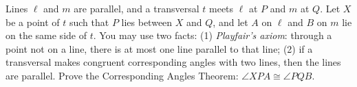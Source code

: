 Lines $\ell$ and $m$ are parallel, and a transversal $t$ meets $\ell$ at $P$ and $m$ at $Q$. Let $X$ be a point of $t$ such that $P$ lies between $X$ and $Q$, and let $A$ on $\ell$ and $B$ on $m$ lie on the same side of $t$. You may use two facts: (1) \emph{Playfair's axiom}: through a point not on a line, there is at most one line parallel to that line; (2) if a transversal makes congruent corresponding angles with two lines, then the lines are parallel. Prove the Corresponding Angles Theorem: $\angle XPA\cong\angle PQB$.
